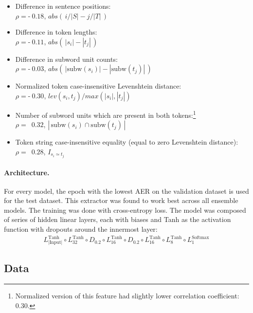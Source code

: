 \smallskip
\begin{itemize}
    \item Difference in sentence positions:\\
    $\rho = \text{-}\ 0.18$, \qquad $abs(\,i/|S|-j/|T|\,)$ 
    \item Difference in token lengths:\\
    $\rho = \text{-}\ 0.11$, \qquad $abs(\,|s_i|-|t_j|\,)$ 
    \item Difference in subword unit counts:\\
    $\rho = \text{-}\ 0.03$, \qquad $abs(\,|\text{subw}(s_i)|-|\text{subw}(t_j)|\,)$ 
    \item Normalized token case-insensitive Levenshtein distance:\\
    $\rho = \text{-}\ 0.30$, \qquad $lev(s_i, t_j)/max(|s_i|, |t_j|)$
    \item Number of subword units which are present in both tokens:\footnote{Normalized version of this feature had slightly lower correlation coefficient: $0.30$.}\\
    $\rho = \,\,\,0.32$, \qquad $|\,\text{subw}(s_i) \cap \text{subw}(t_j)\,|$
    \item Token string case-insensitive equality (equal to zero Levenshtein distance):\\
    $\rho = \,\,\,0.28$, \qquad $I_{s_i \simeq t_j}$
\end{itemize}

\paragraph{Architecture.} For every model, the epoch with the lowest AER on the validation dataset is used for the test dataset. This extractor was found to work best across all ensemble models. The training was done with cross-entropy loss. The model was composed of series of hidden linear layers, each with biases and Tanh as the activation function with dropouts around the innermost layer:
\begin{gather*}
    L_{|\text{Input}|}^\text{Tanh}\circ L_{32}^\text{Tanh} \circ D_{0.2} \circ L_{16}^\text{Tanh} \circ D_{0.2} \circ L_{16}^\text{Tanh} \circ L_{8}^\text{Tanh} \circ L_1^\text{Softmax}
\end{gather*}

\subsection{Data}

